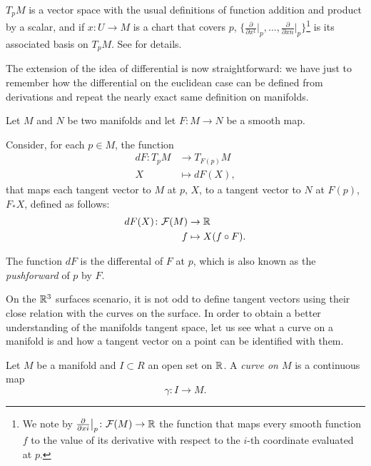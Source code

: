 \begin{remark}
	$T_p M$ is a vector space with the usual definitions of function addition and product by a scalar, and if $x \colon U \to M$ is a chart that covers $p$, $\{ \frac{\partial}{\partial x^1}\bigr|_p, \dots, \frac{\partial}{\partial xn}\bigr|_p\}$\footnote{We note by $\frac{\partial}{\partial xi}\bigr|_p \colon \mathcal{F}(M) \to \mathbb{R}$ the function that maps every smooth function $f$ to the value of its derivative with respect to the $i$-th coordinate evaluated at $p$.} is its associated basis on $T_p M$. See \cite[p. 8]{docarmo79} for details.
\end{remark}

The extension of the idea of differential is now straightforward: we have just to remember how the differential on the euclidean case can be defined from derivations and repeat the nearly exact same definition on manifolds.

\begin{definition}
	Let $M$ and $N$ be two manifolds and let $F \colon M \to N$ be a smooth map.
	
	Consider, for each $p \in M$, the function
	\begin{align*}
		dF \colon T_p M &\to T_{F(p)} M \\
		X &\mapsto dF(X),
	\end{align*}
	that maps each tangent vector to $M$ at $p$, $X$, to a tangent vector to $N$ at $F(p)$, $F_*X$, defined as follows:
	\begin{align*}
		dF(X) \colon \mathcal{F}(M) &\to \mathbb{R} \\
		f &\mapsto X(f \circ F).					
	\end{align*}

	The function $dF$ is the differental of $F$ at $p$, which is also known as the \emph{pushforward} of $p$ by $F$.
		   																	
\end{definition}

On the $\mathbb{R}^3$ surfaces scenario, it is not odd to define tangent vectors using their close relation with the curves on the surface. In order to obtain a better understanding of the manifolds tangent space, let us see what a curve on a manifold is and how a tangent vector on a point can be identified with them.

\begin{definition}
	Let $M$ be a manifold and $I \subset R$ an open set on $\mathbb{R}$. A \emph{curve on $M$} is a continuous map
	\[
		\gamma \colon I \to M.
	\]
\end{definition}

